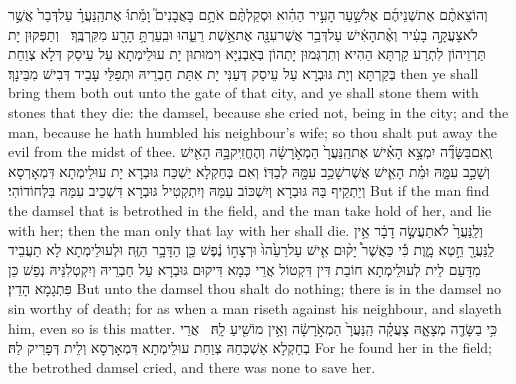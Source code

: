 {וְהוֹצֵאתֶ֨ם אֶת\maqqaf שְׁנֵיהֶ֜ם אֶל\maqqaf שַׁ֣עַר \legarmeh  הָעִ֣יר הַהִ֗וא וּסְקַלְתֶּ֨ם אֹתָ֥ם בָּאֲבָנִים֮ וָמֵ֒תוּ֒ אֶת\maqqaf הַֽנַּעֲרָ֗ עַל\maqqaf דְּבַר֙ אֲשֶׁ֣ר לֹא\maqqaf צָעֲקָ֣ה בָעִ֔יר וְאֶ֨ת\maqqaf הָאִ֔ישׁ עַל\maqqaf דְּבַ֥ר אֲשֶׁר\maqqaf עִנָּ֖ה אֶת\maqqaf אֵ֣שֶׁת רֵעֵ֑הוּ וּבִֽעַרְתָּ֥ הָרָ֖ע מִקִּרְבֶּֽךָ׃ \setuma }
{וְתַפְּקוּן יָת תַּרְוֵיהוֹן לִתְרַע קַרְתָּא הַהִיא וְתִרְגְּמוּן יָתְהוֹן בְּאַבְנַיָּא וִימוּתוּן יָת עוּלֵימְתָא עַל עֵיסַק דְּלָא צְוַחַת בְּקַרְתָּא וְיָת גּוּבְרָא עַל עֵיסַק דְּעַנִּי יָת אִתַּת חַבְרֵיהּ וּתְפַלֵּי עָבֵיד דְּבִישׁ מִבֵּינָךְ׃}
{then ye shall bring them both out unto the gate of that city, and ye shall stone them with stones that they die: the damsel, because she cried not, being in the city; and the man, because he hath humbled his neighbour’s wife; so thou shalt put away the evil from the midst of thee.}{}
{וְֽאִם\maqqaf בַּשָּׂדֶ֞ה יִמְצָ֣א הָאִ֗ישׁ אֶת\maqqaf הַֽנַּעֲרָ֙ הַמְאֹ֣רָשָׂ֔ה וְהֶחֱזִֽיק\maqqaf בָּ֥הּ הָאִ֖ישׁ וְשָׁכַ֣ב עִמָּ֑הּ וּמֵ֗ת הָאִ֛ישׁ אֲשֶׁר\maqqaf שָׁכַ֥ב עִמָּ֖הּ לְבַדּֽוֹ׃}
{וְאִם בְּחַקְלָא יַשְׁכַּח גּוּבְרָא יָת עוּלֵימְתָא דִּמְאָרְסָא וְיַתְקֵיף בַּהּ גּוּבְרָא וְיִשְׁכּוֹב עִמַּהּ וְיִתְקְטִיל גּוּבְרָא דִּשְׁכֵיב עִמַּהּ בִּלְחוֹדוֹהִי׃}
{But if the man find the damsel that is betrothed in the field, and the man take hold of her, and lie with her; then the man only that lay with her shall die.}{}
{וְלַֽנַּעֲרָ֙ לֹא\maqqaf תַעֲשֶׂ֣ה דָבָ֔ר אֵ֥ין לַֽנַּעֲרָ֖ חֵ֣טְא מָ֑וֶת כִּ֡י כַּאֲשֶׁר֩ יָק֨וּם אִ֤ישׁ עַל\maqqaf רֵעֵ֙הוּ֙ וּרְצָח֣וֹ נֶ֔פֶשׁ כֵּ֖ן הַדָּבָ֥ר הַזֶּֽה׃}
{וּלְעוּלֵימְתָא לָא תַעֲבֵיד מִדָּעַם לֵית לְעוּלֵימְתָא חוֹבַת דִּין דִּקְטוֹל אֲרֵי כְּמָא דִּיקוּם גּוּבְרָא עַל חַבְרֵיהּ וְיִקְטְלִנֵּיהּ נְפַשׁ כֵּן פִּתְגָמָא הָדֵין׃}
{But unto the damsel thou shalt do nothing; there is in the damsel no sin worthy of death; for as when a man riseth against his neighbour, and slayeth him, even so is this matter.}{}
{כִּ֥י בַשָּׂדֶ֖ה מְצָאָ֑הּ צָעֲקָ֗ה הַֽנַּעֲרָ֙ הַמְאֹ֣רָשָׂ֔ה וְאֵ֥ין מוֹשִׁ֖יעַ לָֽהּ׃ \setuma }
{אֲרֵי בְחַקְלָא אַשְׁכְּחַהּ צְוַחַת עוּלֵימְתָא דִּמְאָרְסָא וְלֵית דְּפָרִיק לַהּ׃}
{For he found her in the field; the betrothed damsel cried, and there was none to save her.}{}

